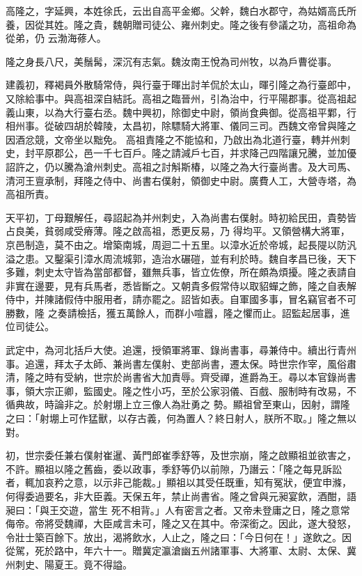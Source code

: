 \begin{pinyinscope}
 高隆之，字延興，本姓徐氏，云出自高平金鄉。父幹，魏白水郡守，為姑婿高氏所養，因從其姓。隆之貴，魏朝贈司徒公、雍州刺史。隆之後有參議之功，高祖命為從弟，仍
 云渤海蓚人。



 隆之身長八尺，美鬚髯，深沉有志氣。魏汝南王悅為司州牧，以為戶曹從事。



 建義初，釋褐員外散騎常侍，與行臺于暉出討羊侃於太山，暉引隆之為行臺郎中，又除給事中。與高祖深自結託。高祖之臨晉州，引為治中，行平陽郡事。從高祖起義山東，以為大行臺右丞。魏中興初，除御史中尉，領尚食典御。從高祖平鄴，行相州事。從破四胡於韓陵，太昌初，除驃騎大將軍、儀同三司。西魏文帝曾與隆之因酒忿競，文帝坐以黜免。
 高祖責隆之不能協和，乃啟出為北道行臺，轉并州刺史，封平原郡公，邑一千七百戶。隆之請減戶七百，并求降己四階讓兄騰，並加優詔許之，仍以騰為滄州刺史。高祖之討斛斯椿，以隆之為大行臺尚書。及大司馬、清河王亶承制，拜隆之侍中、尚書右僕射，領御史中尉。廣費人工，大營寺塔，為高祖所責。



 天平初，丁母艱解任，尋詔起為并州刺史，入為尚書右僕射。時初給民田，貴勢皆占良美，貧弱咸受瘠薄。隆之啟高祖，悉更反易，乃
 得均平。又領營構大將軍，京邑制造，莫不由之。增築南城，周迴二十五里。以漳水近於帝城，起長隄以防汎溢之患。又鑿渠引漳水周流城郭，造治水碾磑，並有利於時。魏自孝昌已後，天下多難，刺史太守皆為當部都督，雖無兵事，皆立佐僚，所在頗為煩擾。隆之表請自非實在邊要，見有兵馬者，悉皆斷之。又朝貴多假常侍以取貂蟬之飾，隆之自表解侍中，并陳諸假侍中服用者，請亦罷之。詔皆如表。自軍國多事，冒名竊官者不可勝數，隆
 之奏請檢括，獲五萬餘人，而群小喧囂，隆之懼而止。詔監起居事，進位司徒公。



 武定中，為河北括戶大使。追還，授領軍將軍、錄尚書事，尋兼侍中。續出行青州事。追還，拜太子太師、兼尚書左僕射、吏部尚書，遷太保。時世宗作宰，風俗肅清，隆之時有受納，世宗於尚書省大加責辱。齊受禪，進爵為王。尋以本官錄尚書事，領大宗正卿，監國史。隆之性小巧，至於公家羽儀、百戲、服制時有改易，不循典故，時論非之。於射堋上立三像人為壯勇之
 勢。顯祖曾至東山，因射，謂隆之曰：「射堋上可作猛獸，以存古義，何為置人？終日射人，朕所不取。」隆之無以對。



 初，世宗委任兼右僕射崔暹、黃門郎崔季舒等，及世宗崩，隆之啟顯祖並欲害之，不許。顯祖以隆之舊齒，委以政事，季舒等仍以前隙，乃譖云：「隆之每見訴訟者，輒加哀矜之意，以示非己能裁。」顯祖以其受任既重，知有冤狀，便宜申滌，何得委過要名，非大臣義。天保五年，禁止尚書省。隆之曾與元昶宴飲，酒酣，語昶曰：「與王交遊，當生
 死不相背。」人有密言之者。又帝未登庸之日，隆之意常侮帝。帝將受魏禪，大臣咸言未可，隆之又在其中。帝深銜之。因此，遂大發怒，令壯士築百餘下。放出，渴將飲水，人止之，隆之曰：「今日何在！」遂飲之。因從駕，死於路中，年六十一。贈冀定瀛滄幽五州諸軍事、大將軍、太尉、太保、冀州刺史、陽夏王。竟不得謚。




\end{pinyinscope}
